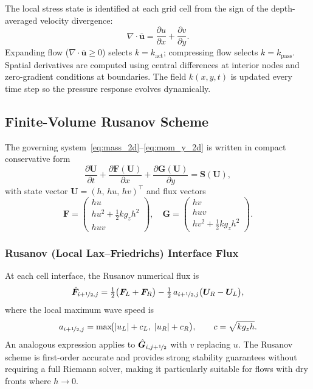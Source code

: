 \documentclass[10pt, conference]{FMFP2023}
\begin{document}
The local stress state is identified at each grid cell from the sign
of the depth-averaged velocity divergence:
\begin{equation}
    \nabla\cdot\bar{\bm{u}}
    = \frac{\partial u}{\partial x} + \frac{\partial v}{\partial y}.
    \label{eq:divergence}
\end{equation}
Expanding flow ($\nabla\cdot\bar{\bm{u}}\geq0$) selects
$k=k_{\text{act}}$; compressing flow selects $k=k_{\text{pass}}$.
Spatial derivatives are computed using central differences at interior
nodes and zero-gradient conditions at boundaries.
The field $k(x,y,t)$ is updated every time step so the pressure
response evolves dynamically.

\subsection{Finite-Volume Rusanov Scheme}

The governing system~\eqref{eq:mass_2d}--\eqref{eq:mom_y_2d} is
written in compact conservative form
\begin{equation}
    \frac{\partial\bm{U}}{\partial t}
    + \frac{\partial\bm{F}(\bm{U})}{\partial x}
    + \frac{\partial\bm{G}(\bm{U})}{\partial y}
    = \bm{S}(\bm{U}),
    \label{eq:conservation_form}
\end{equation}
with state vector $\bm{U}=(h,\,hu,\,hv)^\top$ and flux vectors
\begin{equation}
    \bm{F} = \begin{pmatrix}hu\\ hu^2+\tfrac{1}{2}kg_zh^2\\ huv
             \end{pmatrix}, \quad
    \bm{G} = \begin{pmatrix}hv\\ huv\\ hv^2+\tfrac{1}{2}kg_zh^2
             \end{pmatrix}.
    \label{eq:flux_vectors}
\end{equation}

\subsubsection{Rusanov (Local Lax--Friedrichs) Interface Flux}

At each cell interface, the Rusanov numerical flux is
\begin{equation}
    \hat{\bm{F}}_{i+\nicefrac{1}{2},j}
    = \tfrac{1}{2}\bigl(\bm{F}_L+\bm{F}_R\bigr)
    - \tfrac{1}{2}\,a_{i+\nicefrac{1}{2},j}
      \bigl(\bm{U}_R-\bm{U}_L\bigr),
    \label{eq:rusanov_flux}
\end{equation}
where the local maximum wave speed is
\begin{equation}
    a_{i+\nicefrac{1}{2},j}
    = \max\!\bigl(|u_L|+c_L,\;|u_R|+c_R\bigr),
    \qquad c = \sqrt{kg_zh}.
    \label{eq:rusanov_speed}
\end{equation}
An analogous expression applies to $\hat{\bm{G}}_{i,j+\nicefrac{1}{2}}$
with $v$ replacing $u$.
The Rusanov scheme is first-order accurate and provides strong
stability guarantees without requiring a full Riemann solver, making
it particularly suitable for flows with dry fronts where $h\to0$.
\end{document}
